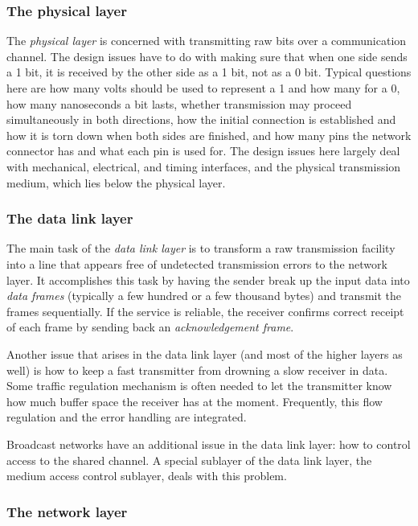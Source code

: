 \documentclass[b5paper,11pt]{memoir}
\begin{document}
\subsubsection{The physical layer}

The \emph{physical layer} is concerned with transmitting raw bits over a communication channel.
The design issues have to do with making sure that when one side sends a 1 bit, it is received by the other side as a 1 bit, not as a 0 bit.
Typical questions here are how many volts should be used to represent a 1 and how many for a 0, how many nanoseconds a bit lasts, whether transmission may proceed simultaneously in both directions, how the initial connection is established and how it is torn down when both sides are finished, and how many pins the network connector has and what each pin is used for.
The design issues here largely deal with mechanical, electrical, and timing interfaces, and the physical transmission medium, which lies below the physical layer.


\subsubsection{The data link layer}

The main task of the \emph{data link layer} is to transform a raw transmission facility into a line that appears free of undetected
transmission errors to the network layer.
It accomplishes this task by having the sender break up the input data into \emph{data frames} (typically a few hundred or a few thousand bytes) and transmit the frames sequentially.
If the service is reliable, the receiver confirms correct receipt of each frame by sending back an \emph{acknowledgement frame}.

Another issue that arises in the data link layer (and most of the higher layers as well) is how to keep a fast transmitter from drowning a slow receiver in data.
Some traffic regulation mechanism is often needed to let the transmitter know how much buffer space the receiver has at the moment.
Frequently, this flow regulation and the error handling are integrated.

Broadcast networks have an additional issue in the data link layer: how to control access to the shared channel.
A special sublayer of the data link layer, the medium access control sublayer, deals with this problem.


\subsubsection{The network layer}
\end{document}
